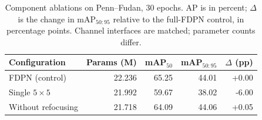 \begin{table}[!t]
\centering
\caption{Component ablations on Penn--Fudan, 30 epochs. AP is in percent; $\Delta$ is the change in mAP$_{50:95}$ relative to the full-FDPN control, in percentage points. Channel interfaces are matched; parameter counts differ.}
\label{tab:ablation}
\footnotesize
\setlength{\tabcolsep}{3pt}
\begin{tabular}{lrrrr}
\toprule
Configuration & Params (M) & mAP$_{50}$ & mAP$_{50:95}$ & $\Delta$ (pp)\\
\midrule
FDPN (control) & 22.236 & 65.25 & 44.01 & +0.00\\
Single $5\times5$ & 21.992 & 59.67 & 38.02 & -6.00\\
Without refocusing & 21.718 & 64.09 & 44.06 & +0.05\\
\bottomrule
\end{tabular}
\end{table}
